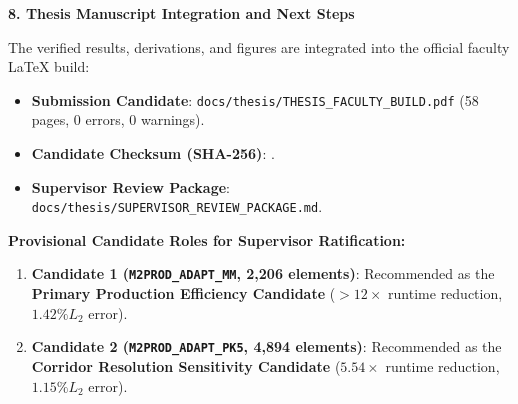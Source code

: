 \documentclass[11pt,a4paper]{article}
\newcommand{\headx}[1]{{\color{navy}\fontsize{17}{20}\selectfont\bfseries #1}\par\vspace{1.5mm}{\color{blue}\rule{\linewidth}{1.1pt}}\vspace{3mm}}
\begin{document}
\headx{8. Thesis Manuscript Integration and Next Steps}
The verified results, derivations, and figures are integrated into the official faculty LaTeX build:
\begin{itemize}
    \item \textbf{Submission Candidate}: \texttt{docs/thesis/THESIS\_FACULTY\_BUILD.pdf} (58 pages, 0 errors, 0 warnings).
    \item \textbf{Candidate Checksum (SHA-256)}: .
    \item \textbf{Supervisor Review Package}: \texttt{docs/thesis/SUPERVISOR\_REVIEW\_PACKAGE.md}.
\end{itemize}

\textbf{Provisional Candidate Roles for Supervisor Ratification:}
\begin{enumerate}
    \item \textbf{Candidate 1 (\texttt{M2PROD\_ADAPT\_MM}, 2,206 elements)}: Recommended as the \textbf{Primary Production Efficiency Candidate} ($>12\times$ runtime reduction, $1.42\% L_2$ error).
    \item \textbf{Candidate 2 (\texttt{M2PROD\_ADAPT\_PK5}, 4,894 elements)}: Recommended as the \textbf{Corridor Resolution Sensitivity Candidate} ($5.54\times$ runtime reduction, $1.15\% L_2$ error).
\end{enumerate}
\end{document}
